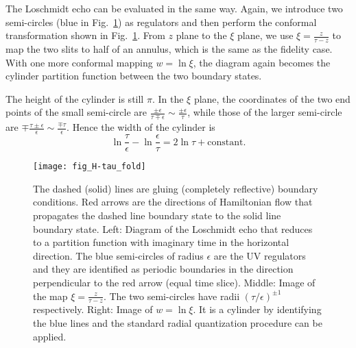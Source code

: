The Loschmidt echo can be evaluated in the same way. Again, we introduce two semi-circles (blue in Fig.~\ref{fig:H-tau_fold}) as regulators and then perform the conformal transformation shown in Fig.~\ref{fig:H-tau_fold}. From $z$ plane to the $\xi$ plane, we use $\xi = \frac{z}{\tau - z}$ to map the two slits to half of an annulus, which is the same as the fidelity case. With one more conformal mapping $w = \ln \xi$, the diagram again becomes the cylinder partition function between the two boundary states. 

The height of the cylinder is still $\pi$. In the $\xi$ plane, the coordinates of the two end points of the small semi-circle are $\frac{\pm \epsilon}{ \tau \mp \epsilon} \sim \frac{\pm \epsilon}{ \tau }$, while those of the larger semi-circle are $\mp \frac{\tau \pm \epsilon}{\epsilon} \sim \frac{\mp \tau}{\epsilon}$. Hence the width of the cylinder is
\begin{equation}
\label{eq:echo_cyd_width}
\ln \frac{\tau}{\epsilon} - \ln \frac{\epsilon}{\tau } = 2 \ln \tau + \text{constant}.  
\end{equation}

\begin{figure}[htb]
\centering
\texttt{[image: fig\_H-tau\_fold]}
\caption{The dashed (solid) lines are gluing (completely reflective) boundary conditions. Red arrows are the directions of Hamiltonian flow that propagates the dashed line boundary state to the solid line boundary state. Left: Diagram of the Loschmidt echo that reduces to a partition function with imaginary time in the horizontal direction. The blue semi-circles of radius $\epsilon$ are the UV regulators and they are identified as periodic boundaries in the direction perpendicular to the red arrow (equal time slice). Middle: Image of the map $\xi = \frac{z}{\tau - z}$. The two semi-circles have radii $({\tau}/{\epsilon})^{\pm1}$ respectively.  Right: Image of $w = \ln \xi$. It is a cylinder by identifying the blue lines and the standard radial quantization procedure can be applied. }
\label{fig:H-tau_fold}
\end{figure}


